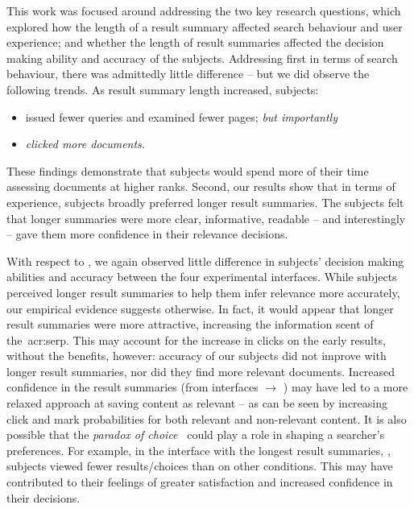 This work was focused around addressing the two key research questions, which explored  how the length of a result summary affected search behaviour and user experience; and  whether the length of result summaries affected the decision making ability and accuracy of the subjects. Addressing  first in terms of search behaviour, there was admittedly little difference -- but we did observe the following trends. As result summary length increased, subjects:

\begin{itemize}
    \item{issued fewer queries and examined fewer pages; \emph{but importantly}}
    \item{\emph{clicked more documents.}}
\end{itemize}

These findings demonstrate that subjects would spend more of their time assessing documents at higher ranks. Second, our results show that in terms of experience, subjects broadly preferred longer result summaries. The subjects felt that longer summaries were more clear, informative, readable -- and interestingly -- gave them more confidence in their relevance decisions.

With respect to , we again observed little difference in subjects' decision making abilities and accuracy between the four experimental interfaces. While subjects perceived longer result summaries to help them infer relevance more accurately, our empirical evidence suggests otherwise. In fact, it would appear that longer result summaries were more attractive, increasing the information scent of the~\gls{acr:serp}. This may account for the increase in clicks on the early results, without the benefits, however: accuracy of our subjects did not improve with longer result summaries, nor did they find more relevant documents. Increased confidence in the result summaries (from interfaces  $\rightarrow$ ) may have led to a more relaxed approach at saving content as relevant -- as can be seen by increasing click and mark probabilities for both relevant and non-relevant content. It is also possible that the \emph{paradox of choice}~\citep{oulasvirta2009serp_size} could play a role in shaping a searcher's preferences. For example, in the interface with the longest result summaries, , subjects viewed fewer results/choices than on other conditions. This may have contributed to their feelings of greater satisfaction and increased confidence in their decisions.

